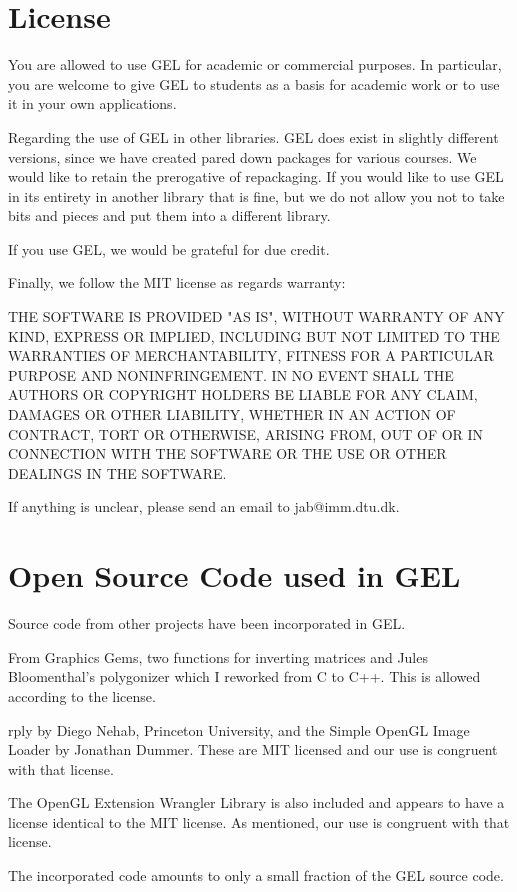 \documentclass[a4paper]{article}
\begin{document}
\section{License}  
%
%
\begin{trivlist}
\item
You are allowed to use GEL for academic or commercial purposes. In particular, you are welcome to give GEL to students as a basis for academic work or to use it in your own applications.
\item
Regarding the use of GEL in other libraries. GEL does exist in slightly different versions, since we have created pared down packages for various courses. We would like to retain the prerogative of repackaging. If you would like to use GEL in its entirety in another library  that is fine, but we do not allow you not to take bits and pieces and put them into a different library.
\item
If you use GEL, we would be grateful for due credit.
\item
Finally, we follow the MIT license as regards warranty:
\item
THE SOFTWARE IS PROVIDED "AS IS", WITHOUT WARRANTY OF ANY KIND, EXPRESS OR IMPLIED, INCLUDING BUT NOT LIMITED TO THE WARRANTIES OF MERCHANTABILITY, FITNESS FOR A PARTICULAR PURPOSE AND NONINFRINGEMENT. IN NO EVENT SHALL THE AUTHORS OR COPYRIGHT HOLDERS BE LIABLE FOR ANY CLAIM, DAMAGES OR OTHER LIABILITY, WHETHER IN AN ACTION OF CONTRACT, TORT OR OTHERWISE, ARISING FROM, OUT OF OR IN CONNECTION WITH THE SOFTWARE OR THE USE OR OTHER DEALINGS IN THE SOFTWARE.
\item
If anything is unclear, please send an email to jab@imm.dtu.dk. 
\end{trivlist}
%
%
\section{Open Source Code used in GEL}  
%
%
Source code from other projects have been incorporated in GEL.
\begin{trivlist}
\item From Graphics Gems, two functions for inverting matrices and Jules Bloomenthal's polygonizer which I reworked from C to C++. This is allowed according to the license.
\item rply by Diego Nehab, Princeton University, and the Simple OpenGL Image Loader by Jonathan Dummer.  These are MIT licensed and our use is congruent with that license.
\item The OpenGL Extension Wrangler Library is also included and appears to have a license identical to the MIT license.	 As mentioned, our use is congruent with that license.
\end{trivlist}
The incorporated code amounts to only a small fraction of the GEL source code.
\end{document}
